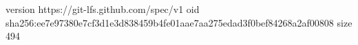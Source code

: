 version https://git-lfs.github.com/spec/v1
oid sha256:ee7e97380e7cf3d1e3d838459b4fe01aae7aa275edad3f0bef84268a2af00808
size 494
